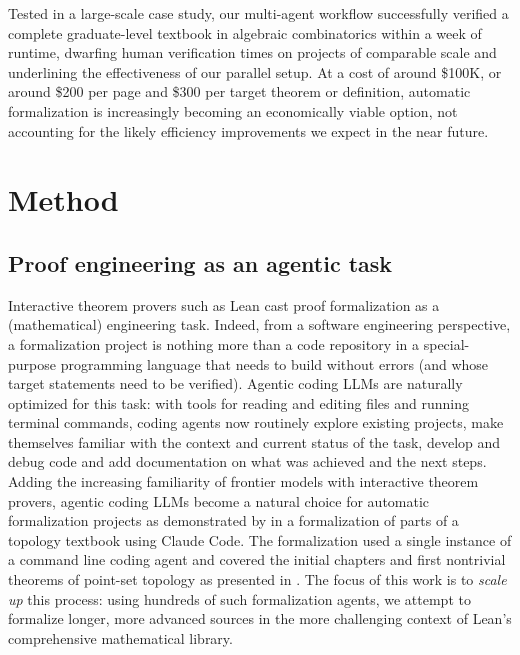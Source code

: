 \documentclass[]{fairmeta}
\begin{document}
Tested in a large-scale case study, our multi-agent workflow successfully verified a complete graduate-level textbook in algebraic combinatorics \citep{grinberg2025introduction} within a week of runtime, dwarfing human verification times on projects of comparable scale and underlining the effectiveness of our parallel setup.
At a cost of around \$100K, or around \$200 per page and \$300 per target theorem or definition, automatic formalization is increasingly becoming an economically viable option, not accounting for the likely efficiency improvements we expect in the near future.














\section{Method}
\label{sec:method}


\subsection{Proof engineering as an agentic task}
Interactive theorem provers such as Lean cast proof formalization as a (mathematical) engineering task.
Indeed, from a software engineering perspective, a formalization project is nothing more than a code repository in a special-purpose programming language that needs to build without errors (and whose target statements need to be verified).
Agentic coding LLMs are naturally optimized for this task: with tools for reading and editing files and running terminal commands, coding agents now routinely explore existing projects, make themselves familiar with the context and current status of the task, develop and debug code and add documentation on what was achieved and the next steps.
Adding the increasing familiarity of frontier models with interactive theorem provers, agentic coding LLMs become a natural choice for automatic formalization projects as demonstrated by \citet{urban2026130klinesformaltopology} in a formalization of parts of a topology textbook using Claude Code. The formalization used a single instance of a command line coding agent and covered the initial chapters and first nontrivial theorems of point-set topology as presented in \citet{munkres_topology_2018}.
The focus of this work is to \emph{scale up} this process: using hundreds of such formalization agents, we attempt to formalize longer, more advanced sources in the more challenging context of Lean's comprehensive mathematical library.
\end{document}
